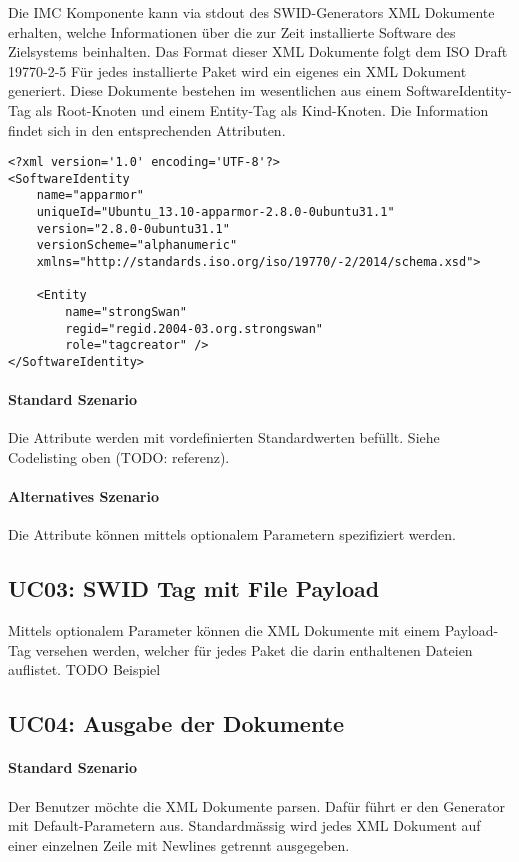 Die IMC Komponente kann via stdout des SWID-Generators XML Dokumente erhalten, welche Informationen über die zur Zeit installierte Software des Zielsystems beinhalten.
Das Format dieser XML Dokumente folgt dem ISO Draft 19770-2-5
Für jedes installierte Paket wird ein eigenes ein XML Dokument generiert.
Diese Dokumente bestehen im wesentlichen aus einem SoftwareIdentity-Tag als Root-Knoten und einem Entity-Tag als Kind-Knoten. Die Information findet sich in den entsprechenden Attributen.

\begin{verbatim}
<?xml version='1.0' encoding='UTF-8'?>
<SoftwareIdentity
    name="apparmor"
    uniqueId="Ubuntu_13.10-apparmor-2.8.0-0ubuntu31.1"
    version="2.8.0-0ubuntu31.1"
    versionScheme="alphanumeric"
    xmlns="http://standards.iso.org/iso/19770/-2/2014/schema.xsd">

    <Entity
        name="strongSwan"
        regid="regid.2004-03.org.strongswan"
        role="tagcreator" />
</SoftwareIdentity>
\end{verbatim}

\paragraph{Standard Szenario}
Die Attribute werden mit vordefinierten Standardwerten befüllt. Siehe Codelisting oben (TODO: referenz).

\paragraph{Alternatives Szenario}
Die Attribute können mittels optionalem Parametern spezifiziert werden.

\subsection{UC03: SWID Tag mit File Payload}
Mittels optionalem Parameter können die XML Dokumente mit einem Payload-Tag versehen werden, welcher für jedes Paket die darin enthaltenen Dateien auflistet.
TODO Beispiel

\subsection{UC04: Ausgabe der Dokumente}

\paragraph{Standard Szenario}
Der Benutzer möchte die XML Dokumente parsen. Dafür führt er den Generator mit
Default-Parametern aus. Standardmässig wird jedes XML Dokument auf einer einzelnen Zeile
mit Newlines getrennt ausgegeben.

